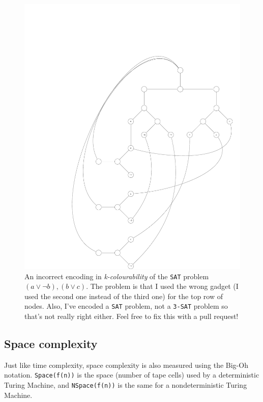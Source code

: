\begin{figure}[H]
  \centering
  \includegraphics[width=\textwidth]{diagrams/graph14}
  \caption{An incorrect encoding in \textit{k-colourability} of the \texttt{SAT} 
  problem $(a \vee \neg b), (b \vee c)$. The problem is that I used the wrong
  gadget (I used the second one instead of the third one) for the top row of
  nodes. Also, I've encoded a \texttt{SAT} problem, not a \texttt{3-SAT} problem
  so that's not really right either. Feel free to fix this with a pull request!}
  \label{fig:k-colour-3-sat}
\end{figure}

\subsection{Space complexity}


Just like time complexity, space complexity is also measured using the Big-Oh
notation. \texttt{Space(f(n))} is the space (number of tape cells) used by a
deterministic Turing Machine, and \texttt{NSpace(f(n))} is the same for a
nondeterministic Turing Machine.

